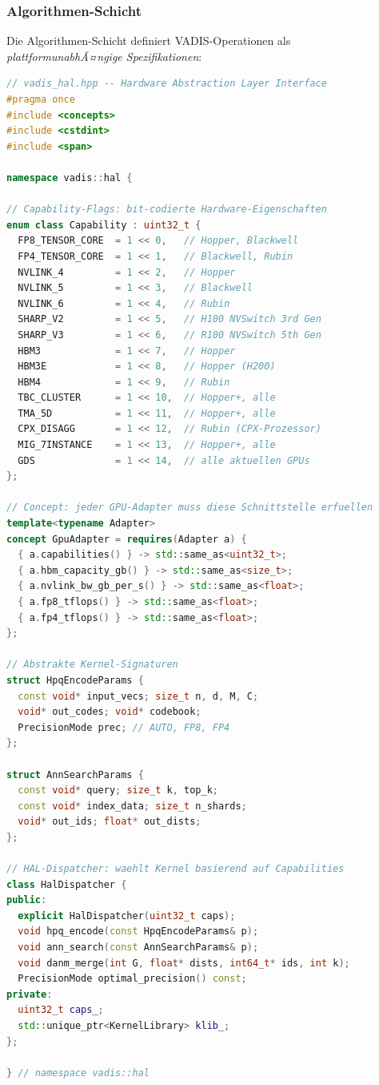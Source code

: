 ﻿\documentclass[12pt,a4paper]{article}
\begin{document}
\subsubsection{Algorithmen-Schicht}

Die Algorithmen-Schicht definiert VADIS-Operationen als
\emph{plattformunabhÃ¤ngige Spezifikationen}:

\begin{lstlisting}[language=C++, caption={VADIS HAL Interface (C++20 Concepts)}]
// vadis_hal.hpp -- Hardware Abstraction Layer Interface
#pragma once
#include <concepts>
#include <cstdint>
#include <span>

namespace vadis::hal {

// Capability-Flags: bit-codierte Hardware-Eigenschaften
enum class Capability : uint32_t {
  FP8_TENSOR_CORE  = 1 << 0,   // Hopper, Blackwell
  FP4_TENSOR_CORE  = 1 << 1,   // Blackwell, Rubin
  NVLINK_4         = 1 << 2,   // Hopper
  NVLINK_5         = 1 << 3,   // Blackwell
  NVLINK_6         = 1 << 4,   // Rubin
  SHARP_V2         = 1 << 5,   // H100 NVSwitch 3rd Gen
  SHARP_V3         = 1 << 6,   // R100 NVSwitch 5th Gen
  HBM3             = 1 << 7,   // Hopper
  HBM3E            = 1 << 8,   // Hopper (H200)
  HBM4             = 1 << 9,   // Rubin
  TBC_CLUSTER      = 1 << 10,  // Hopper+, alle
  TMA_5D           = 1 << 11,  // Hopper+, alle
  CPX_DISAGG       = 1 << 12,  // Rubin (CPX-Prozessor)
  MIG_7INSTANCE    = 1 << 13,  // Hopper+, alle
  GDS              = 1 << 14,  // alle aktuellen GPUs
};

// Concept: jeder GPU-Adapter muss diese Schnittstelle erfuellen
template<typename Adapter>
concept GpuAdapter = requires(Adapter a) {
  { a.capabilities() } -> std::same_as<uint32_t>;
  { a.hbm_capacity_gb() } -> std::same_as<size_t>;
  { a.nvlink_bw_gb_per_s() } -> std::same_as<float>;
  { a.fp8_tflops() } -> std::same_as<float>;
  { a.fp4_tflops() } -> std::same_as<float>;
};

// Abstrakte Kernel-Signaturen
struct HpqEncodeParams {
  const void* input_vecs; size_t n, d, M, C;
  void* out_codes; void* codebook;
  PrecisionMode prec; // AUTO, FP8, FP4
};

struct AnnSearchParams {
  const void* query; size_t k, top_k;
  const void* index_data; size_t n_shards;
  void* out_ids; float* out_dists;
};

// HAL-Dispatcher: waehlt Kernel basierend auf Capabilities
class HalDispatcher {
public:
  explicit HalDispatcher(uint32_t caps);
  void hpq_encode(const HpqEncodeParams& p);
  void ann_search(const AnnSearchParams& p);
  void danm_merge(int G, float* dists, int64_t* ids, int k);
  PrecisionMode optimal_precision() const;
private:
  uint32_t caps_;
  std::unique_ptr<KernelLibrary> klib_;
};

} // namespace vadis::hal
\end{lstlisting}
\end{document}
